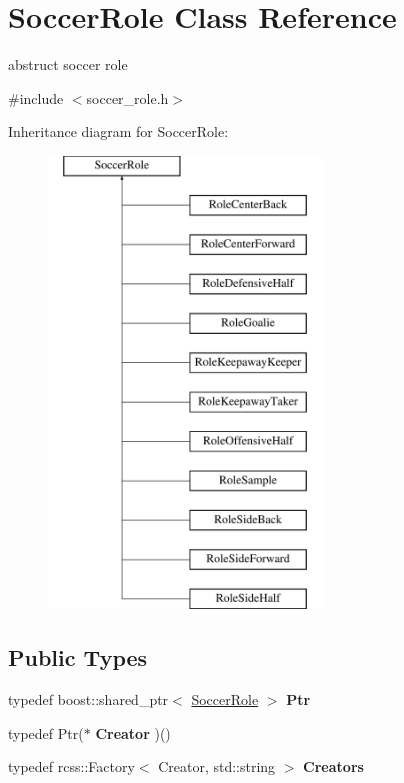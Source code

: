 \hypertarget{classSoccerRole}{
\section{SoccerRole Class Reference}
\label{classSoccerRole}
}


abstruct soccer role  




{\ttfamily \#include $<$soccer\_\-role.h$>$}

Inheritance diagram for SoccerRole:\begin{figure}[H]
\begin{center}
\leavevmode
\includegraphics[height=12.000000cm]{classSoccerRole}
\end{center}
\end{figure}
\subsection*{Public Types}
\begin{DoxyCompactItemize}
\item 
\hypertarget{classSoccerRole_a70d140c9e8534390675b2e61c4f0348b}{
typedef boost::shared\_\-ptr$<$ \hyperlink{classSoccerRole}{SoccerRole} $>$ {\bfseries Ptr}}
\label{classSoccerRole_a70d140c9e8534390675b2e61c4f0348b}

\item 
\hypertarget{classSoccerRole_ad047a3535773bf97e9ba3d16b9e998dc}{
typedef Ptr($\ast$ {\bfseries Creator} )()}
\label{classSoccerRole_ad047a3535773bf97e9ba3d16b9e998dc}

\item 
\hypertarget{classSoccerRole_a00275711107e0b313b811b98dea53dfa}{
typedef rcss::Factory$<$ Creator, std::string $>$ {\bfseries Creators}}
\label{classSoccerRole_a00275711107e0b313b811b98dea53dfa}

\end{DoxyCompactItemize}

